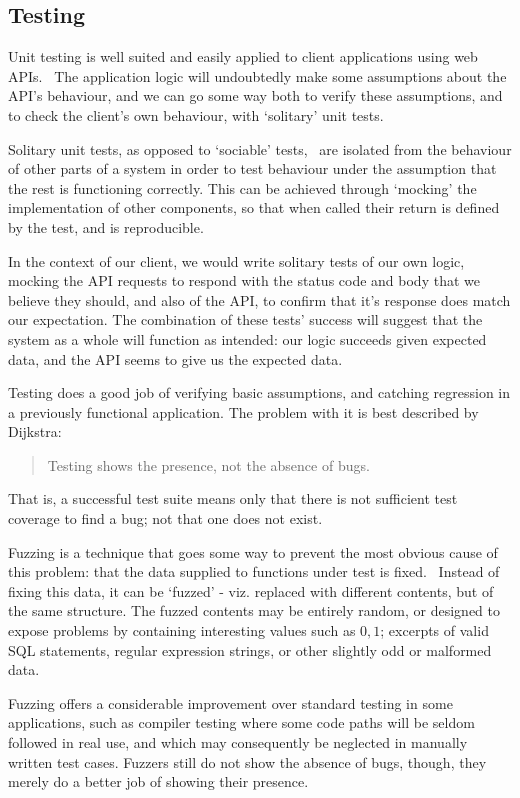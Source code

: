 \subsection{Testing} \label{soln:testing}

Unit testing is well suited and easily applied to client applications using web APIs.~\cite{front_backend_testing} The application logic will undoubtedly make some assumptions about the API's behaviour, and we can go some way both to verify these assumptions, and to check the client's own behaviour, with `solitary' unit tests. \cite{unit_testing}

Solitary unit tests, as opposed to `sociable' tests,~\cite{unit_testing} are isolated from the behaviour of other parts of a system in order to test behaviour under the assumption that the rest is functioning correctly. This can be achieved through `mocking' the implementation of other components, so that when called their return is defined by the test, and is reproducible. \cite{solitary_unit_testing, mocking}

In the context of our client, we would write solitary tests of our own logic, mocking the API requests to respond with the status code and body that we believe they should, and also of the API, to confirm that it's response does match our expectation. The combination of these tests' success will suggest that the system as a whole will function as intended: our logic succeeds given expected data, and the API seems to give us the expected data.~

Testing does a good job of verifying basic assumptions, and catching regression in a previously functional application. The problem with it is best described by Dijkstra:
\begin{quote}
Testing shows the presence, not the absence of bugs. \cite{dijkstra_quote}
\end{quote}

That is, a successful test suite means only that there is not sufficient test coverage to find a bug; not that one does not exist.

Fuzzing is a technique that goes some way to prevent the most obvious cause of this problem: that the data supplied to functions under test is fixed.~\cite{fuzz} Instead of fixing this data, it can be `fuzzed' - viz. replaced with different contents, but of the same structure. The fuzzed contents may be entirely random, or designed to expose problems by containing interesting values such as $0,1$; excerpts of valid SQL statements, regular expression strings, or other slightly odd or malformed data. \cite{fuzzing}

Fuzzing offers a considerable improvement over standard testing in some applications, such as compiler testing where some code paths will be seldom followed in real use, and which may consequently be neglected in manually written test cases. \cite{taming_fuzzers} Fuzzers still do not show the absence of bugs, though, they merely do a better job of showing their presence.